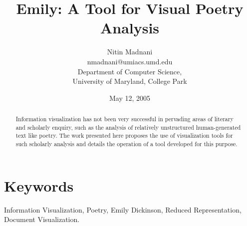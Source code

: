 \documentclass[10pt, twocolumn]{article}
\begin{document}
\title{Emily: A Tool for Visual Poetry Analysis}
\author{Nitin Madnani \\
nmadnani@umiacs.umd.edu \\
Department of Computer Science, \\
University of Maryland, College Park
}
\date{May 12, 2005}
\maketitle

\begin{abstract}
Information visualization has not been very successful in pervading areas of literary and scholarly enquiry, such as the analysis of relatively unstructured human-generated text like poetry. The work presented here proposes the use of visualization tools for such scholarly analysis and details the operation of a tool developed for this purpose. 
\end{abstract}

\section*{Keywords}
Information Visualization, Poetry, Emily Dickinson, Reduced Representation, Document Visualization. 
\end{document}
